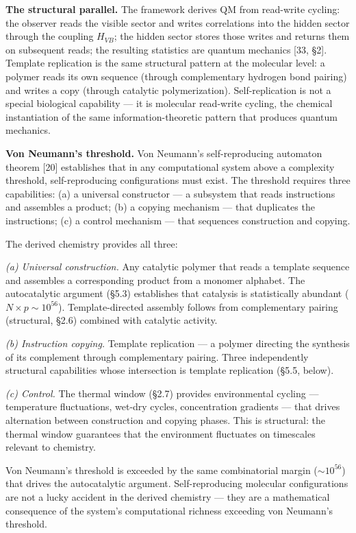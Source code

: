 \documentclass[
]{article}
\begin{document}
\textbf{The structural parallel.} The framework derives QM from
read-write cycling: the observer reads the visible sector and writes
correlations into the hidden sector through the coupling \(H_{VB}\); the
hidden sector stores those writes and returns them on subsequent reads;
the resulting statistics are quantum mechanics {[}33, §2{]}. Template
replication is the same structural pattern at the molecular level: a
polymer reads its own sequence (through complementary hydrogen bond
pairing) and writes a copy (through catalytic polymerization).
Self-replication is not a special biological capability --- it is
molecular read-write cycling, the chemical instantiation of the same
information-theoretic pattern that produces quantum mechanics.

\textbf{Von Neumann's threshold.} Von Neumann's self-reproducing
automaton theorem {[}20{]} establishes that in any computational system
above a complexity threshold, self-reproducing configurations must
exist. The threshold requires three capabilities: (a) a universal
constructor --- a subsystem that reads instructions and assembles a
product; (b) a copying mechanism --- that duplicates the instructions;
(c) a control mechanism --- that sequences construction and copying.

The derived chemistry provides all three:

\emph{(a) Universal construction.} Any catalytic polymer that reads a
template sequence and assembles a corresponding product from a monomer
alphabet. The autocatalytic argument (§5.3) establishes that catalysis
is statistically abundant (\(N \times p \sim 10^{56}\)).
Template-directed assembly follows from complementary pairing
(structural, §2.6) combined with catalytic activity.

\emph{(b) Instruction copying.} Template replication --- a polymer
directing the synthesis of its complement through complementary pairing.
Three independently structural capabilities whose intersection is
template replication (§5.5, below).

\emph{(c) Control.} The thermal window (§2.7) provides environmental
cycling --- temperature fluctuations, wet-dry cycles, concentration
gradients --- that drives alternation between construction and copying
phases. This is structural: the thermal window guarantees that the
environment fluctuates on timescales relevant to chemistry.

Von Neumann's threshold is exceeded by the same combinatorial margin
(\(\sim 10^{56}\)) that drives the autocatalytic argument.
Self-reproducing molecular configurations are not a lucky accident in
the derived chemistry --- they are a mathematical consequence of the
system's computational richness exceeding von Neumann's threshold.
\end{document}
